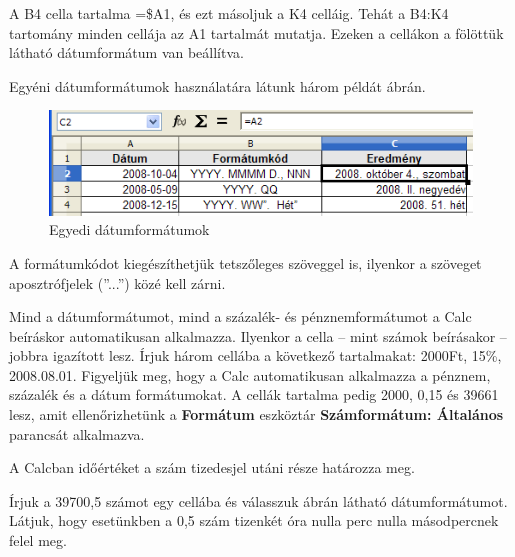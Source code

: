 A B4 cella tartalma =\$A1, és ezt másoljuk a K4 celláig. Tehát a
B4:K4 tartomány minden cellája az A1 tartalmát mutatja. Ezeken a
cellákon a fölöttük látható dátumformátum van
beállítva.

Egyéni dátumformátumok használatára látunk három
példát  ábrán.

\begin{figure}[!h]
\begin{center}
\includegraphics[width=13.095cm]{oocalcv1-img48.png}
\caption{Egyedi dátumformátumok}\label{EgyediDátumformátumok}
\end{center}
\end{figure}

A formátumkódot kiegészíthetjük tetszőleges szöveggel
is, ilyenkor a szöveget aposztrófjelek
(''...'') közé kell zárni.

Mind a dátumformátumot, mind a százalék- és
pénznemformátumot a Calc beíráskor automatikusan alkalmazza.
Ilyenkor a cella --  mint számok beírásakor --  jobbra igazított
lesz. Írjuk három cellába a következő tartalmakat: 2000Ft,
15\%, 2008.08.01. Figyeljük meg, hogy a Calc automatikusan alkalmazza
a pénznem, százalék és a dátum formátumokat. A cellák
tartalma pedig 2000, 0,15 és 39661 lesz, amit ellenőrizhetünk a
\textbf{Formátum} eszköztár \textbf{Számformátum:
Általános} parancsát alkalmazva.

A Calcban időértéket a szám tizedesjel utáni része
határozza meg.

Írjuk a 39700,5 számot egy cellába és válasszuk 
ábrán látható dátumformátumot. Látjuk,  hogy
esetünkben a 0,5 szám tizenkét óra nulla perc nulla
másodpercnek felel meg.

